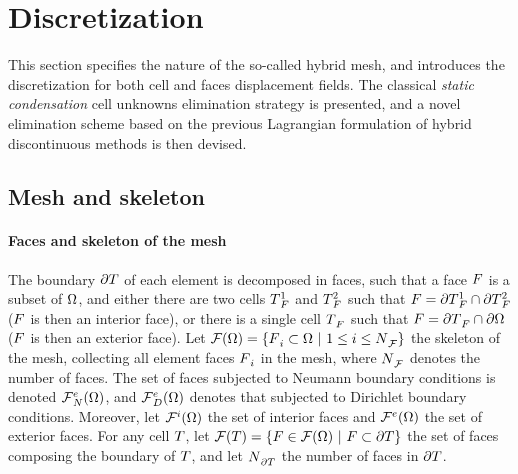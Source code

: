 \section{Discretization}
\label{sec_discretization}

This section specifies the nature of the so-called hybrid mesh,
and introduces the discretization for both cell and faces displacement fields.
The classical \textit{static condensation} cell unknowns elimination strategy is presented, and a novel elimination scheme
based on the previous Lagrangian formulation of hybrid discontinuous methods is then devised.

\subsection{Mesh and skeleton}

\paragraph{Faces and skeleton of the mesh}

The boundary ${\partial T}$ of each element is decomposed in faces, such
that a face ${F}$ is a subset of ${\Omega}$, and either there are two
cells ${{T}}{}_{F}^{1}$ and ${{T}}{}_{F}^{2}$ such that $F = {{\partial T}}{}_{F}^{1} \cap {{\partial T}}{}_{F}^{2}$
(${F}$ is then an interior face), or there is a single cell ${{T}}{}_{F}^{}$ such
that ${F} = {{\partial T}}{}_{F}^{} \cap {\partial \Omega}$ (${F}$ is then an exterior face).
Let $\mathcal{F}({\Omega}) = \{ {{F}}{}_{i}^{} \subset {\Omega} \ \vert \ 1 \leq i
\leq {N}{}_{\mathcal{F}}^{} \}$ the skeleton of the mesh, collecting all element faces
${{F}}{}_{i}^{}$ in the mesh, where ${N}{}_{\mathcal{F}}^{}$ denotes the number of faces. The set of
faces subjected to Neumann boundary conditions is denoted
$\mathcal{F}{}_{N}^{e}({\Omega})$, and $\mathcal{F}{}_{D}^{e}({\Omega})$
denotes that subjected to Dirichlet boundary conditions.
Moreover, let
$\mathcal{F}{}_{}^{i}({\Omega})$ the set of interior faces
and
$\mathcal{F}{}_{}^{e}({\Omega})$ the set of exterior faces. For any cell
${T}$, let $\mathcal{F}({T}) = \{ {F} \in \mathcal{F}({\Omega}) \ \vert \ {F}
\subset {\partial T} \}$ the set of faces composing the boundary of ${T}$,
and let ${N}{}_{{\partial T}}^{}$ the number of faces in ${\partial T}$.

